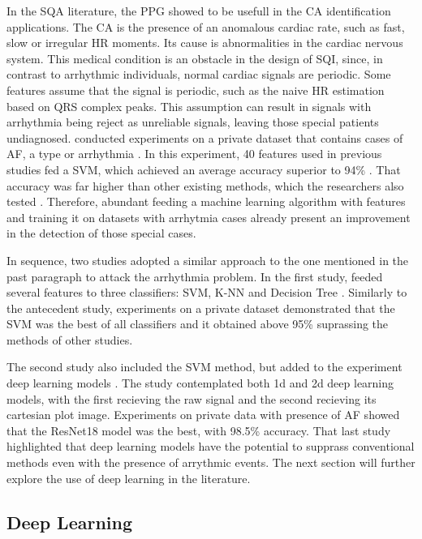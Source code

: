 		
In the \gls{SQA} literature, the \gls{PPG} showed to be usefull in the \gls{CA} identification applications. The \gls{CA} is the presence of an anomalous cardiac rate, such as fast, slow or irregular \gls{HR} moments. Its cause is abnormalities in the cardiac nervous system. This medical condition is an obstacle in the design of \gls{SQI}, since, in contrast to arrhythmic individuals, normal cardiac signals are periodic. Some features assume that the signal is periodic, such as the naive \gls{HR} estimation based on QRS complex peaks. This assumption can result in signals with arrhythmia being reject as unreliable signals, leaving those special patients undiagnosed. \citeauthor{review-5} conducted experiments on a private dataset that contains cases of \gls{AF}, a type or arrhythmia \cite{review-5}. In this experiment, 40 features used in previous studies fed a \gls{SVM}, which achieved an average accuracy superior to 94\% \cite{review-5}. That accuracy was far higher than other existing methods, which the researchers also tested \cite{review-5}. Therefore, abundant feeding a machine learning algorithm with features and training it on datasets with arrhytmia cases already present an improvement in the detection of those special cases.

In sequence, two studies adopted a similar approach to the one mentioned in the past paragraph to attack the arrhythmia problem. In the first study, \citeauthor{review-6} feeded several features to three classifiers: \gls{SVM}, \gls{K-NN} and Decision Tree \cite{review-6}. Similarly to the antecedent study, experiments on a private dataset demonstrated that the \gls{SVM} was the best of all classifiers and it obtained above 95\% suprassing the methods of other studies. 

The second study also included the \gls{SVM} method, but added to the experiment deep learning models \cite{review-7}. The study contemplated both 1d and 2d deep learning models, with the first recieving the raw signal and the second recieving its cartesian plot image. Experiments on private data with presence of \gls{AF} showed that the ResNet18 model was the best, with 98.5\% accuracy. That last study highlighted that deep learning models have the potential to supprass conventional methods even with the presence of arrythmic events. The next section will further explore the use of deep learning in the literature.  

\subsection{Deep Learning}
\label{sec:deep_learning}

